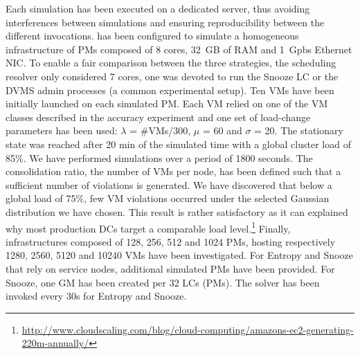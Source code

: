 Each simulation has been executed on a dedicated server, thus
avoiding interferences between simulations and ensuring
reproducibility between the different invocations.
%
\vmps has been configured to simulate a homogeneous infrastructure of
PMs composed of 8 cores, 32~GB of RAM and 1~Gpbs Ethernet NIC. To
enable a fair comparison between the three strategies, the scheduling
resolver only considered 7 cores, \ie one was devoted to run the
Snooze LC or the DVMS admin processes (a common experimental setup).
Ten VMs have been initially launched on each simulated PM. Each VM
relied on one of the VM classes described in the accuracy experiment
and one set of load-change parameters has been used: $\lambda$ =
\#VMs/300, $\mu$ = 60 and $\sigma$ = 20. The stationary state was
reached after 20 min of the simulated time with a global cluster load
of 85\%.
We have performed simulations over a period of 1800 seconds. The
consolidation ratio, \ie the number of VMs per node, has been defined
such that a sufficient number of violations is generated. We have
discovered that below a global load of 75\%, few VM violations occurred
under the selected Gaussian distribution we have chosen. This result
is rather satisfactory as it can explained why most production DCs
target a comparable load
level.\footnote{\url{http://www.cloudscaling.com/blog/cloud-computing/amazons-ec2-generating-220m-annually/}}
Finally, infrastructures composed of 128, 256, 512 and 1024 PMs,
hosting respectively 1280, 2560, 5120 and 10240 VMs have been
investigated. For Entropy and Snooze that rely on service nodes,
additional simulated PMs have been provided. For Snooze, one GM has
been created per 32 LCs (\ie PMs). The solver has been invoked
every 30s for Entropy and Snooze.
%
